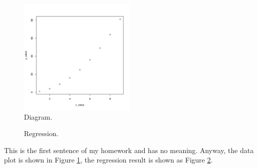 \documentclass[a4paper]{article}
\begin{document}
\begin{figure}[t!]
	\centering
	\includegraphics[width=0.5\textwidth]{diagram.pdf}
	\caption{Diagram.}
	\label{fig:diagram}
\end{figure}

\begin{figure}[t!]
	\centering
	
	\caption{Regression.}
	\label{fig:regression}
\end{figure}

This is the first sentence of my homework and has no meaning.
Anyway,
the data plot is shown in Figure \ref{fig:diagram},
the regression result is shown as Figure \ref{fig:regression}.
\end{document}
